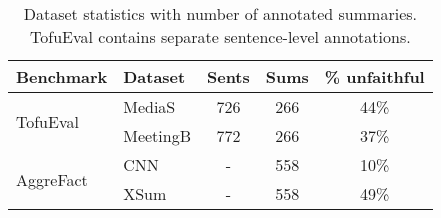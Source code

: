 \begin{table}
\centering
\small
\begin{tabular}{@{}llccc@{}}
\toprule
Benchmark                  & Dataset     & \multicolumn{1}{l}{Sents} & \multicolumn{1}{l}{Sums} & \multicolumn{1}{l}{\% unfaithful} \\ \midrule 
\multirow{2}{*}{TofuEval}  & MediaS    & 726& 266                      & 44\%                                        \\
                           & MeetingB & 772 &266                      & 37\%                                        \\ \midrule 
\multirow{2}{*}{AggreFact} & CNN        & - & 558                      & 10\%                                        \\
                           & XSum       & - & 558                      & 49\%      \\                                 
\bottomrule
\end{tabular}
\caption{Dataset statistics with number of annotated summaries. TofuEval contains separate sentence-level annotations.}
\label{tab:dataset}
\end{table}